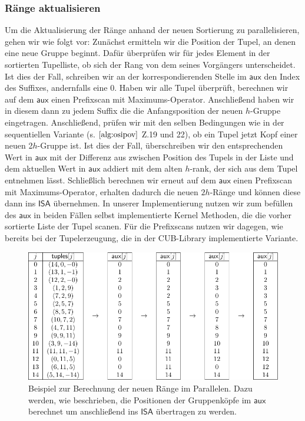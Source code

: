 \subsubsection{Ränge aktualisieren}
Um die Aktualisierung der Ränge anhand der neuen Sortierung zu parallelisieren, gehen wir wie folgt vor:
Zunächst ermitteln wir die Position der Tupel, an denen eine neue Gruppe beginnt. Dafür überprüfen wir für jedes Element in der sortierten Tupelliste, ob sich der Rang von dem seines Vorgängers unterscheidet. Ist dies der Fall, schreiben wir an der korrespondierenden Stelle im $\mathsf{aux}$ den Index des Suffixes, andernfalls eine 0. Haben wir alle Tupel überprüft, berechnen wir auf dem $\mathsf{aux}$ einen Prefixscan mit Maximums-Operator. Anschließend haben wir in diesem dann zu jedem Suffix die die Anfangsposition der neuen $h$-Gruppe eingetragen. 
Anschließend, prüfen wir mit den selben Bedingungen wie in der sequentiellen Variante (s. $\ref{alg:osipov}$ Z.19 und 22), ob ein Tupel jetzt Kopf einer neuen 2$h$-Gruppe ist. Ist dies der Fall, überschreiben wir den entsprechenden Wert in $\mathsf{aux}$ mit der Differenz aus zwischen Position des Tupels in der Liste und dem aktuellen Wert in $\mathsf{aux}$ addiert mit dem alten $h$-rank, der sich aus dem Tupel entnehmen lässt. Schließlich berechnen wir erneut auf dem $\mathsf{aux}$ einen Prefixscan mit Maximums-Operator, erhalten dadurch die neuen $2h$-Ränge und können diese dann ins $\mathsf{ISA}$ übernehmen.
In unserer Implementierung nutzen wir zum befüllen des $\mathsf{aux}$ in beiden Fällen selbst implementierte Kernel Methoden, die die vorher sortierte Liste der Tupel scanen. Für die Prefixscans nutzen wir dagegen, wie bereits bei der Tupelerzeugung, die in der CUB-Library implementierte Variante.
\begin{center}
\begin{figure}
\includegraphics[scale=0.9]{kapitel/saca_algorithmen/osipov/update_ranks_example.pdf}
\caption{Beispiel zur Berechnung der neuen Ränge im Parallelen. Dazu werden, wie beschrieben, die Positionen der Gruppenköpfe im $\mathsf{aux}$ berechnet um anschließend ins $\mathsf{ISA}$ übertragen zu werden.}
\end{figure}

\end{center}